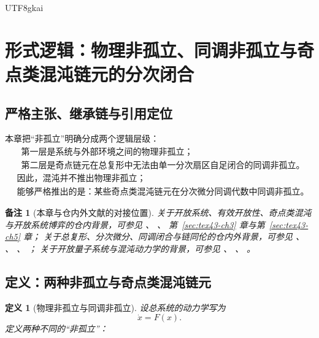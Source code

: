 \documentclass[12pt]{article}
\newtheorem{definition}{定义}[section]
\newtheorem{remark}{备注}[section]
\begin{document}
\begin{CJK*}{UTF8}{gkai}
\section{形式逻辑：物理非孤立、同调非孤立与奇点类混沌链元的分次闭合}
\label{sec:tex43-ch6}

\subsection{严格主张、继承链与引用定位}
\label{subsec:tex43-ch6-convention}

本章把“非孤立”明确分成两个逻辑层级：
\[
  \boxed{
    \begin{aligned}
      &\text{第一层是系统与外部环境之间的物理非孤立；}\\
      &\text{第二层是奇点链元在总复形中无法由单一分次扇区自足闭合的同调非孤立。}
    \end{aligned}
  }
\]
\[
  \boxed{
    \begin{aligned}
      &\text{因此，混沌并不推出物理非孤立；}\\
      &\text{能够严格推出的是：某些奇点类混沌链元在分次微分同调代数中同调非孤立。}
    \end{aligned}
  }
\]

\begin{remark}[本章与仓内外文献的对接位置]
关于开放系统、有效开放性、奇点类混沌与开放系统博弈的仓内背景，可参见
\cite{RepoTex23OpenSystemGame}、
\cite{RepoTex39StatRepair}、
第~\ref{sec:tex43-ch3} 章与第~\ref{sec:tex43-ch5} 章；
关于总复形、分次微分、同调闭合与链同伦的仓内外背景，可参见
\cite{RepoTex29RepairableObstruction}、
\cite{GaoZheng2025GFramework}、
\cite{Weibel1994HomologicalAlgebra}、
\cite{Hatcher2002AT}；
关于开放量子系统与混沌动力学的背景，可参见
\cite{BreuerPetruccione2002OpenQuantumSystems}、
\cite{KatokHasselblatt1995}、
\cite{Ott2002Chaos}。
\end{remark}

\subsection{定义：两种非孤立与奇点类混沌链元}
\label{subsec:tex43-ch6-definitions}

\begin{definition}[物理非孤立与同调非孤立]
\label{def:tex43-two-nonisolation}
设总系统的动力学写为
\[
  \dot x=F(x).
\]
定义两种不同的“非孤立”：


\end{definition}
\end{CJK*}
\end{document}
